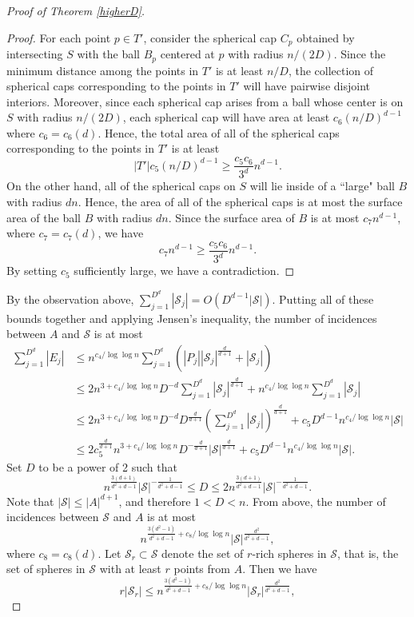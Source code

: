 \begin{proof}[Proof of Theorem \ref{higherD}]
\begin{proof}
%
For each point $p \in T'$, consider the spherical cap $C_p$ obtained by intersecting $S$ with the ball $B_p$ centered at $p$ with radius $n/(2D)$.  Since the minimum distance among the points in $T'$ is at least $n/D$, the collection of spherical caps corresponding to the points in $T'$ will have pairwise disjoint interiors.  Moreover, since each spherical cap arises from a ball whose center is on $S$ with radius $n/(2D)$, each spherical cap will have area at least $c_6(n/D)^{d-1}$ where $c_6 = c_6(d)$.   Hence, the total area of all of the spherical caps corresponding to the points in $T'$ is at least
%
%
$$|T'|c_5(n/D)^{d-1} \geq \frac{c_5c_6}{3^d}n^{d-1}.$$
%
%
%
   \noindent On the other hand, all of the spherical caps on $S$ will lie inside of a ``large" ball $B$ with radius $dn$. Hence, the area of all of the spherical caps is at most the surface area of the ball $B$ with radius $dn$.   Since the surface area of $B$ is at most $c_7n^{d-1}$, where $c_7 = c_7(d)$, we have
%
   $$c_7n^{d-1} \geq \frac{c_5c_6}{3^d}n^{d-1}.$$
%
\noindent By setting $c_5$ sufficiently large, we have a contradiction.\end{proof}
%
%
By the observation above, $\sum_{j=1}^{D^d} |\mathcal{S}_j| = O(D^{d-1}|\mathcal{S}|)$. Putting all of these bounds together and applying Jensen's inequality, the number of incidences between $A$ and $\mathcal{S}$ is at most
%
    \begin{align*} \sum_{j=1}^{D^d} |E_j| &\leq n^{c_4/\log\log n}\sum_{j=1}^{D^d}  \left( |P_j||\mathcal{S}_j|^{\frac{d}{d+1}} + |\mathcal{S}_j| \right)\\
     &  \leq 2 n^{3 + c_4/\log\log n}D^{-d}\sum_{j=1}^{D^d}|\mathcal{S}_j|^{\frac{d}{d+1}} + n^{c_4/\log\log n}\sum_{j=1}^{D^d}|\mathcal{S}_j|  \\
    & \leq 2 n^{3 + c_4/\log\log n}D^{-d} D^{\frac{d}{d+1}}\left( \sum_{j=1}^{D^d} |\mathcal{S}_j| \right)^{\frac{d}{d+1}}  + c_5D^{d-1} n^{ c_4/\log\log n} |\mathcal{S}| \\
    & \leq 2 c_5^{\frac{d}{d+1}}n^{3 + c_4/\log\log n}D^{-\frac{d}{d+1}} |\mathcal{S}|^{\frac{d}{d+1}} + c_5D^{d-1} n^{ c_4/\log\log n} |\mathcal{S}|.
    \end{align*}
%
    Set $D$ to be a power of 2 such that
%
%
    $$   n^{\frac{3(d+1)}{d^2+d-1}} |\mathcal{S}|^{-\frac{1}{d^2+d-1}} \leq D \leq 2 n^{\frac{3(d+1)}{d^2+d-1}} |\mathcal{S}|^{-\frac{1}{d^2+d-1}}.$$ Note that $|\mathcal{S}| \leq |A|^{d+1}$, and therefore $1 < D < n$.  From above, the number of incidences between $\mathcal{S}$ and $A$ is at most$$n^{\frac{3(d^2-1)}{d^2+d-1}+c_8/\log\log n} |\mathcal{S}|^{\frac{d^2}{d^2+d-1}},$$ where $c_8 = c_8(d)$.  Let $\mathcal{S}_r\subset \mathcal{S}$ denote the set of $r$-rich spheres in $\mathcal{S}$, that is, the set of spheres in $\mathcal{S}$ with at least $r$ points from $A$. Then we have $$r|\mathcal{S}_r| \leq n^{\frac{3(d^2-1)}{d^2+d-1}+c_8/\log\log n} |\mathcal{S}_r|^{\frac{d^2}{d^2+d-1}},$$

\end{proof}
